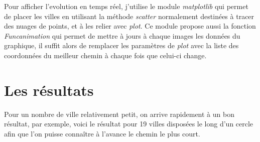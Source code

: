 \documentclass[12pt]{article}
\begin{document}
Pour afficher l'evolution en temps réel, j'utilise le module \emph{matplotlib} qui permet de placer les villes en utilisant la méthode
\emph{scatter} normalement destinées à tracer des nuages de points, et à les relier avec \emph{plot}. Ce module propose aussi la fonction
\emph{Funcanimation} qui permet de mettre à jours à chaque images les données du graphique, il suffit alors de remplacer les paramètres
de \emph{plot} avec la liste des coordonnées du meilleur chemin à chaque fois que celui-ci change.

\section{Les résultats}
\label{sec-3}

Pour un nombre de ville relativement petit, on arrive rapidement à un bon résultat, par exemple, voici le résultat pour 19 villes disposées
le long d'un cercle afin que l'on puisse connaître à l'avance le chemin le plus court.
\end{document}
